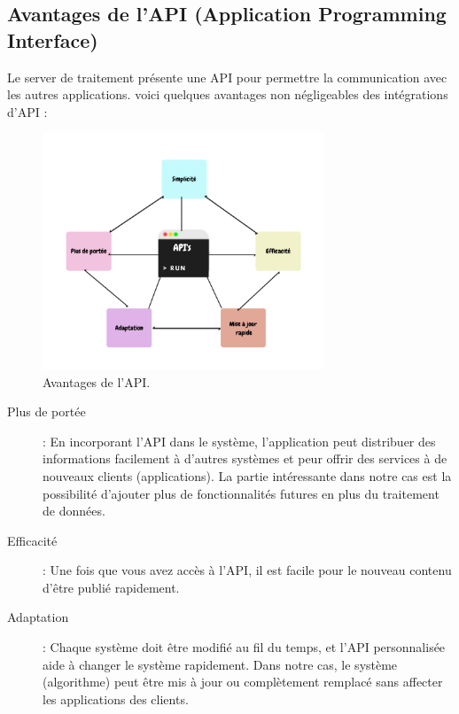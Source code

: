 \subsection{Avantages de l'API (Application Programming Interface)}
Le server de traitement présente une API pour permettre la communication avec les autres applications. voici quelques avantages non négligeables des intégrations d'API \cite{BenefitsAPIDevelopers2019}:

\begin{figure}[h!]
    \center
    \includegraphics[width=0.75\textwidth]{Images/chapter3/apiAvantages.png}
    \caption{Avantages de l'API.}
  \end{figure}


\begin{description}
    
    \item [Plus de portée]:  En incorporant l’API dans le système, l’application peut distribuer des informations facilement à
    d’autres systèmes et peur offrir des services à de nouveaux clients (applications). La partie intéressante dans notre cas est la possibilité d'ajouter plus de fonctionnalités futures en plus du traitement de données.
     \item[Efficacité] : Une fois que vous avez accès à l'API, il est facile pour le nouveau contenu d'être publié rapidement.
     \item[Adaptation] : Chaque système doit être modifié au fil du temps, et l'API personnalisée aide à changer le système rapidement. Dans notre cas, le système (algorithme) peut être mis à jour ou complètement remplacé sans affecter les applications des clients.
     
\end{description} 

